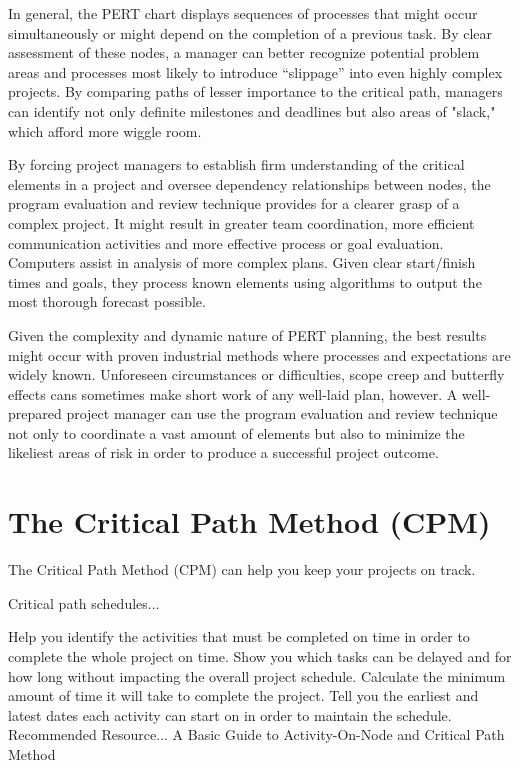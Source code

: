 In general, the PERT chart displays sequences of processes that might occur simultaneously or might depend on the completion of a previous task. By clear assessment of these nodes, a manager can better recognize potential problem areas and processes most likely to introduce “slippage” into even highly complex projects. By comparing paths of lesser importance to the critical path, managers can identify not only definite milestones and deadlines but also areas of "slack," which afford more wiggle room.

By forcing project managers to establish firm understanding of the critical elements in a project and oversee dependency relationships between nodes, the program evaluation and review technique provides for a clearer grasp of a complex project. It might result in greater team coordination, more efficient communication activities and more effective process or goal evaluation. Computers assist in analysis of more complex plans. Given clear start/finish times and goals, they process known elements using algorithms to output the most thorough forecast possible.

Given the complexity and dynamic nature of PERT planning, the best results might occur with proven industrial methods where processes and expectations are widely known. Unforeseen circumstances or difficulties, scope creep and butterfly effects cans sometimes make short work of any well-laid plan, however. A well-prepared project manager can use the program evaluation and review technique not only to coordinate a vast amount of elements but also to minimize the likeliest areas of risk in order to produce a successful project outcome.

\newpage
\section{The Critical Path Method (CPM)}
The Critical Path Method (CPM) can help you keep your projects on track.

Critical path schedules...

Help you identify the activities that must be completed on time in order to complete the whole project on time.
Show you which tasks can be delayed and for how long without impacting the overall project schedule.
Calculate the minimum amount of time it will take to complete the project.
Tell you the earliest and latest dates each activity can start on in order to maintain the schedule.
Recommended Resource...
A Basic Guide to Activity-On-Node and Critical Path Method

